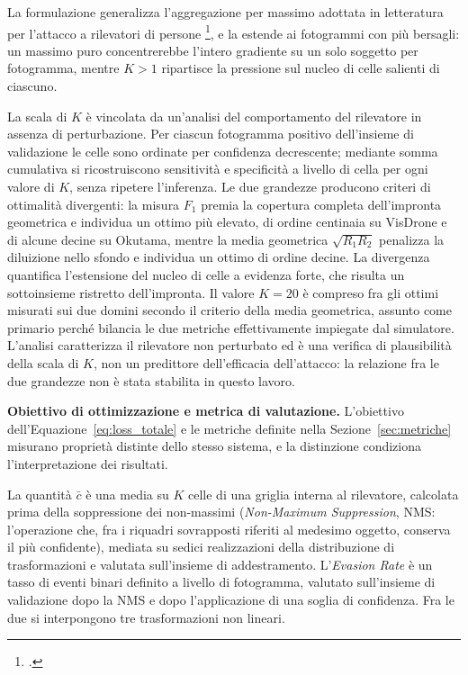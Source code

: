 \ifstampa\documentclass[a4paper,12pt,twoside,openright]{report}\else\documentclass[a4paper,12pt]{report}\fi
\newif\ifrevisione \revisionefalse
\DeclareRobustCommand{\rev}[1]{\ifrevisione{\color{blue!65!black}#1}\else#1\fi}
\begin{document}
La formulazione generalizza l'aggregazione per massimo adottata in letteratura
per l'attacco a rilevatori di persone \footcite{thys_2019}, e la estende ai
fotogrammi con più bersagli: un massimo puro concentrerebbe l'intero gradiente
su un solo soggetto per fotogramma, mentre $K > 1$ ripartisce la pressione sul
nucleo di celle salienti di ciascuno.

La scala di $K$ è vincolata da un'analisi del comportamento del rilevatore in
assenza di perturbazione. Per ciascun fotogramma positivo dell'insieme di
validazione le celle sono ordinate per confidenza decrescente; mediante somma
cumulativa si ricostruiscono sensitività e specificità a livello di cella per
ogni valore di $K$, senza ripetere l'inferenza. Le due grandezze producono
criteri di ottimalità divergenti: la misura $F_1$ premia la copertura completa
dell'impronta geometrica e individua un \rev{ottimo più elevato, di ordine centinaia su VisDrone e di alcune
decine su Okutama}, mentre la
media geometrica $\sqrt{R_1 R_2}$ penalizza la diluizione nello sfondo e
individua un \rev{ottimo} di ordine decine. La divergenza quantifica l'estensione del
nucleo di celle a evidenza forte, che risulta un sottoinsieme ristretto
dell'impronta. Il valore $K = 20$ è compreso fra gli \rev{ottimi} misurati sui due
domini secondo il criterio della media geometrica, assunto come primario perché
bilancia le due metriche effettivamente impiegate dal simulatore. L'analisi
caratterizza il rilevatore non perturbato ed è una verifica di
plausibilità della scala di $K$, non un predittore dell'efficacia dell'attacco:
la relazione fra le due grandezze non è stata stabilita in questo lavoro.

\textbf{Obiettivo di ottimizzazione e metrica di valutazione.}
\label{sec:divario}
L'obiettivo dell'Equazione~\ref{eq:loss_totale} e le metriche definite nella
Sezione~\ref{sec:metriche} misurano proprietà distinte dello stesso sistema, e
la distinzione condiziona l'interpretazione dei risultati.

La quantità $\bar{c}$ è una media su $K$ celle di una griglia interna al
rilevatore, calcolata prima della soppressione dei non-massimi
\rev{(\textit{Non-Maximum Suppression}, NMS: l'operazione che, fra i riquadri
sovrapposti riferiti al medesimo oggetto, conserva il più confidente)},
mediata su sedici realizzazioni della distribuzione di trasformazioni e
valutata \rev{sull'insieme di addestramento}. L'\textit{Evasion Rate} è un tasso di eventi
binari definito a livello di fotogramma, valutato sull'insieme di validazione
dopo la \rev{NMS} e dopo l'applicazione di una soglia di
confidenza. Fra le due si interpongono tre trasformazioni non lineari.
\end{document}
